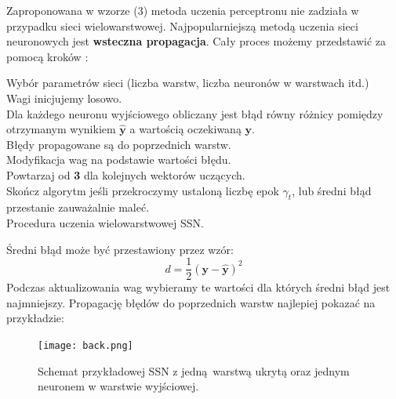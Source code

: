 \documentclass{article}
\renewcommand{\vec}[1]{\mathbf{#1}}
\begin{document}
Zaproponowana w wzorze (3) metoda uczenia perceptronu nie zadziała w przypadku sieci
wielowarstwowej. Najpopularniejszą metodą uczenia sieci neuronowych 
jest \textbf{wsteczna propagacja}. Cały proces możemy przedstawić za pomocą kroków \cite{um}:

{\LinesNumbered
\begin{algorithm}[H]
 Wybór parametrów sieci (liczba warstw, liczba neuronów w warstwach itd.)\\
 Wagi inicjujemy losowo.\\
 Dla każdego neuronu wyjściowego obliczany jest błąd równy różnicy pomiędzy otrzymanym
 wynikiem $\hat{\vec{y}}$ a wartością oczekiwaną $\vec{y}$.\\
 Błędy propagowane są do poprzednich warstw.\\
 Modyfikacja wag na podstawie wartości błędu.\\
 Powtarzaj od \textbf{3} dla kolejnych wektorów uczących.\\
 Skończ algorytm jeśli przekroczymy ustaloną liczbę epok $\gamma_t$,
 lub średni błąd przestanie zauważalnie
 maleć.\\
 \caption{Procedura uczenia wielowarstwowej SSN.}
 \label{alg:2}
\end{algorithm}}
Średni błąd może być przestawiony przez wzór:
\begin{equation}
\label{wz:4}
	d = \frac{1}{2}(\vec{y} - \hat{\vec{y}})^2
\end{equation}
Podczas aktualizowania wag wybieramy te wartości dla których średni błąd jest najmniejszy.
Propagację błędów do poprzednich warstw najlepiej pokazać na przykładzie:

\begin{figure}[H]
\centering
\texttt{[image: back.png]}
\caption{Schemat przykładowej SSN z jedną warstwą ukrytą oraz jednym neuronem w warstwie
wyjściowej.}
\label{fig:ex}
\end{figure}
\end{document}
